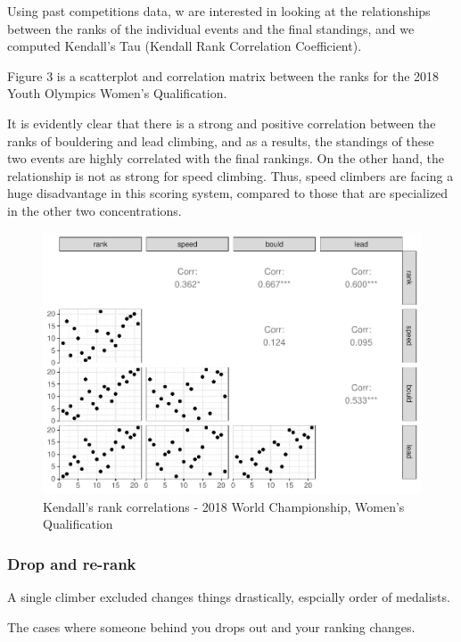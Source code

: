 \documentclass[12pt]{article}
\begin{document}
Using past competitions data, w are interested in looking at the
relationships between the ranks of the individual events and the final
standings, and we computed Kendall's Tau (Kendall Rank Correlation
Coefficient).

Figure 3 is a scatterplot and correlation matrix between the ranks for
the 2018 Youth Olympics Women's Qualification.

It is evidently clear that there is a strong and positive correlation
between the ranks of bouldering and lead climbing, and as a results, the
standings of these two events are highly correlated with the final
rankings. On the other hand, the relationship is not as strong for speed
climbing. Thus, speed climbers are facing a huge disadvantage in this
scoring system, compared to those that are specialized in the other two
concentrations.

\begin{figure}
\centering
\includegraphics{draft_files/figure-latex/unnamed-chunk-9-1.pdf}
\caption{Kendall's rank correlations - 2018 World Championship, Women's
Qualification}
\end{figure}

\hypertarget{drop-and-re-rank}{%
\subsubsection{Drop and re-rank}\label{drop-and-re-rank}}

A single climber excluded changes things drastically, espcially order of
medalists.

The cases where someone behind you drops out and your ranking changes.
\end{document}

